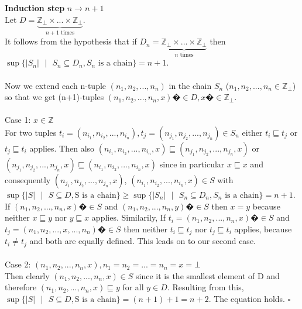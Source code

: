 \documentclass[a4paper,12pt,oneside]{book}
\begin{document}
\textbf{Induction step} $ n\rightarrow n+1$\\
Let $D=\underbrace{\mathbb{Z}_{\bot} \times ... \times \mathbb{Z}_{\bot}}_{n+1\text{\ times}}$. \\
It follows from the hypothesis that if $D_n=\underbrace{\mathbb{Z}_{\bot} \times ... \times \mathbb{Z}_{\bot}}_{n\text{\ times}}$ then $\sup \{\vert S_n \vert \text{ } \vert  \text{ }  S_n \subseteq D_n, S_n\text{ is a chain}\} = n+1$. \\
\\ Now we extend each n-tuple $ (n_1,n_2, ...,n_n)$ in the chain $S_n$ ($n_1, n_2,...,n_n \in \mathbb{Z}_{\bot}$) so that we get (n+1)-tuples $(n_1,n_2, ...,n_n, x)�\in D, x�\in \mathbb{Z}_{\bot}$.\\
\\
Case 1: $x\in\mathbb{Z}$\\
For two tuples $t_i = (n_{i_1},n_{i_2}, ...,n_{i_n}), t_j = (n_{j_1},n_{j_2}, ...,n_{j_n}) \in S_n$ either $t_i \sqsubseteq t_j$ or  $t_j \sqsubseteq t_i$ applies. Then also $(n_{i_1},n_{i_2}, ...,n_{i_n},x) \sqsubseteq (n_{j_1},n_{j_2}, ...,n_{j_n},x)$ or  $(n_{j_1},n_{j_2}, ...,n_{j_n},x) \sqsubseteq (n_{i_1},n_{i_2}, ...,n_{i_n},x)$ since in particular $x\sqsubseteq x$ and consequently $(n_{j_1},n_{j_2}, ...,n_{j_n},x)$, $(n_{i_1},n_{i_2}, ...,n_{i_n},x) \in S$ with $\sup \{\vert S \vert \text{ } \vert  \text{ }  S \subseteq D, \text{S is a chain}\} \geq \sup \{\vert S_n \vert \text{ } \vert  \text{ }  S_n \subseteq D_n, S_n\text{ is a chain}\} = n+1$. \\
If $(n_1,n_2, ...,n_n, x)�\in S$ and $(n_1,n_2, ...,n_n, y)�\in S$ then $x=y$ because neither $x \sqsubseteq y$ nor $y \sqsubseteq x$ applies. Similarily, If $t_i= (n_1,n_2, ...,n_n, x)�\in S$ and $t_j =(n_1,n_2,...,x,...,n_n)�\in S$ then neither $t_i \sqsubseteq t_j$ nor $t_j \sqsubseteq t_i$ applies, because $t_i \neq t_j$ and both are equally defined. This leads on to our second case.\\\\
Case 2: $(n_1,n_2, ...,n_n, x), n_1 = n_2 =... =n_n=x=\bot$\\
Then clearly $(n_1,n_2, ...,n_n, x) \in S$ since it is the smallest element of D and therefore $(n_1,n_2, ...,n_n, x) \sqsubseteq y$ for all $y\in D$. Resulting from this, $\sup \{\vert S \vert \text{ } \vert  \text{ }  S \subseteq D, \text{S is a chain}\} = (n+1)+1 = n+2$. The equation holds.
\hfill $\square$
\end{document}
